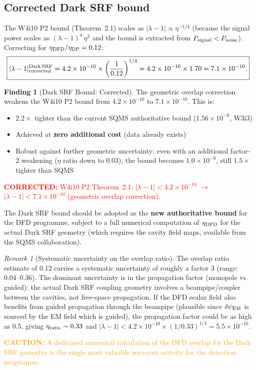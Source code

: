 \documentclass[11pt]{article}
\newcommand{\lam}{\lambda}
\newcommand{\lbone}{|\lambda - 1|}
\newcommand{\ee}[1]{\times 10^{#1}}
\newcommand{\dpsiEM}{\delta\psi_{\rm EM}}
\newcommand{\corrected}[1]{\textcolor{red}{\textbf{CORRECTED:} #1}}
\newcommand{\caution}[1]{\textcolor{orange}{\textbf{CAUTION:} #1}}
\theoremstyle{definition}
\newtheorem{finding}[theorem]{Finding}
\theoremstyle{remark}
\newtheorem{remark}[theorem]{Remark}
\begin{document}
\subsection{Corrected Dark SRF bound}

The W4i10 P2 bound (Theorem~2.1) scales as $\lbone \propto \eta^{-1/4}$
(because the signal power scales as $(\lam-1)^4\,\eta^2$ and the bound
is extracted from $P_{\rm signal} < P_{\rm noise}$). Correcting for
$\eta_{\rm DFD}/\eta_{\rm DP} = 0.12$:
\begin{equation}
\boxed{
\lbone^{\rm Dark\,SRF}_{\rm corrected}
= 4.2\ee{-10}\times\left(\frac{1}{0.12}\right)^{1/4}
= 4.2\ee{-10}\times 1.70
= 7.1\ee{-10}.
}
\label{eq:corrected_bound}
\end{equation}

\begin{finding}[Dark SRF Bound: Corrected]
\label{find:dark_srf_corrected}
The geometric overlap correction weakens the W4i10 P2 bound from
$4.2\ee{-10}$ to $7.1\ee{-10}$. This is:
\begin{itemize}[nosep]
\item $2.2\times$ tighter than the current SQMS authoritative bound
  ($1.56\ee{-9}$, W3i3)
\item Achieved at \textbf{zero additional cost} (data already exists)
\item Robust against further geometric uncertainty: even with an
  additional factor-2 weakening ($\eta$ ratio down to 0.03),
  the bound becomes $1.0\ee{-9}$, still $1.5\times$ tighter
  than SQMS
\end{itemize}

\corrected{W4i10 P2 Theorem~2.1: $\lbone < 4.2\ee{-10}$
$\to$ $\lbone < 7.1\ee{-10}$ (geometric overlap correction).}

The Dark SRF bound should be adopted as the \textbf{new authoritative
bound} for the DFD programme, subject to a full numerical computation
of $\eta_{\rm DFD}$ for the actual Dark SRF geometry (which requires
the cavity field maps, available from the SQMS collaboration).
\end{finding}

\begin{remark}[Systematic uncertainty on the overlap ratio]
The overlap ratio estimate of 0.12 carries a systematic uncertainty
of roughly a factor 3 (range: 0.04--0.36). The dominant uncertainty
is in the propagation factor (monopole vs guided): the actual Dark SRF
coupling geometry involves a beampipe/coupler between the cavities,
not free-space propagation. If the DFD scalar field also benefits from
guided propagation through the beampipe (plausible since $\dpsiEM$
is sourced by the EM field which is guided), the propagation factor
could be as high as 0.5, giving $\eta_{\rm ratio} \sim 0.33$ and
$\lbone < 4.2\ee{-10}\times(1/0.33)^{1/4} = 5.5\ee{-10}$.

\caution{A dedicated numerical calculation of the DFD overlap for
the Dark SRF geometry is the single most valuable zero-cost activity
for the detection programme.}
\end{remark}
\end{document}
